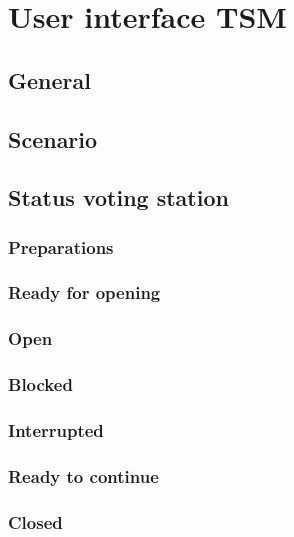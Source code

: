 \chapter{User interface TSM}\label{cha:user-interface-tsm}

\section{General}\label{sec9:general}

\section{Scenario}\label{sec9:scenario}

\section{Status voting station}\label{sec9:stat-voting-stat}

\subsection{Preparations}\label{sec9:preparations}

\subsection{Ready for opening}\label{sec9:ready-opening}

\subsection{Open}\label{sec9:open}

\subsection{Blocked}\label{sec9:blocked}

\subsection{Interrupted}\label{sec9:interrupted}

\subsection{Ready to continue}\label{sec9:ready-continue}

\subsection{Closed}\label{sec9:closed}

